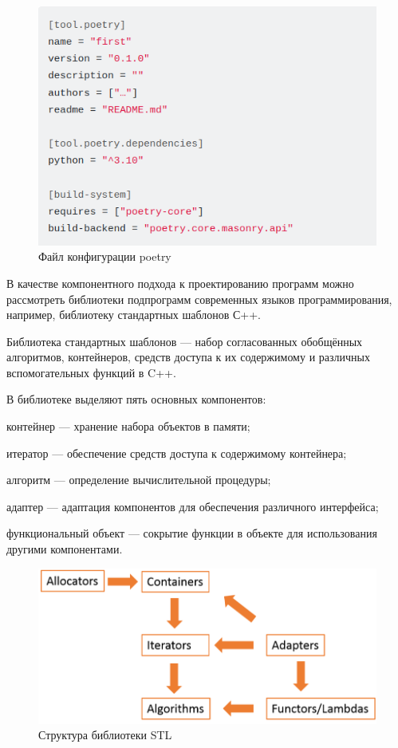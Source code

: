 \begin{figure}[H]
	\includegraphics[scale=0.7]{author/part5/figures/poetry.png}
	\caption{Файл конфигурации poetry}
	\label{fig:poetry}
\end{figure}

В качестве компонентного подхода к проектированию программ можно рассмотреть библиотеки подпрограмм современных языков программирования, например, библиотеку стандартных шаблонов С++.

Библиотека стандартных шаблонов --- набор согласованных обобщённых алгоритмов, контейнеров, средств доступа к их содержимому и различных вспомогательных функций в C++.

В библиотеке выделяют пять основных компонентов:
\begin{textitemize}
	\item контейнер --- хранение набора объектов в памяти;
	\item итератор --- обеспечение средств доступа к содержимому контейнера;
	\item алгоритм --- определение вычислительной процедуры;
	\item адаптер --- адаптация компонентов для обеспечения различного интерфейса;
	\item функциональный объект --- сокрытие функции в объекте для использования другими компонентами.
\end{textitemize}

\begin{figure}[H]
	\includegraphics[scale=0.7]{author/part5/figures/STL.png}
	\caption{Структура библиотеки STL}
	\label{fig:STL}
\end{figure}


